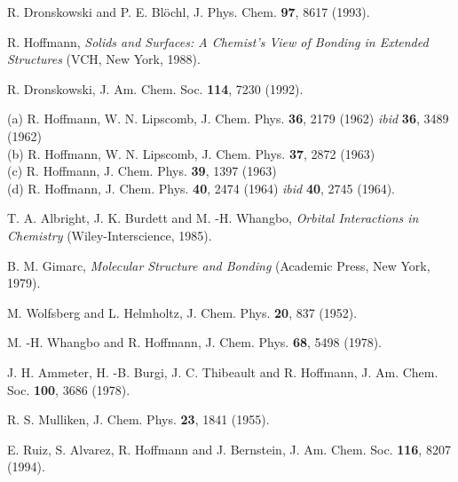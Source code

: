 
 R. Dronskowski and P. E. Bl\"{o}chl, J. Phys. Chem. {\bf 97}, 8617 (1993).

 R. Hoffmann, {\it Solids and Surfaces: A Chemist's View of Bonding in Extended Structures} (VCH, New York, 1988).

 R. Dronskowski, J. Am. Chem. Soc. {\bf 114}, 7230 (1992).


 (a) R. Hoffmann, W. N. Lipscomb, J. Chem. Phys. {\bf 36}, 2179 (1962) {\it ibid} {\bf 36}, 3489 (1962) \\ (b) R. Hoffmann, W. N. Lipscomb, J. Chem. Phys. {\bf 37}, 2872 (1963) \\ (c) R. Hoffmann, J. Chem. Phys. {\bf 39}, 1397 (1963) \\ (d) R. Hoffmann, J. Chem. Phys. {\bf 40}, 2474 (1964) {\it ibid} {\bf 40}, 2745 (1964).

 T. A. Albright, J. K. Burdett and M. -H. Whangbo, {\it Orbital Interactions in Chemistry} (Wiley-Interscience, 1985).

 B. M. Gimarc, {\it Molecular Structure and Bonding} (Academic Press, New York, 1979).

 M. Wolfsberg and L. Helmholtz, J. Chem. Phys. {\bf 20}, 837 (1952).

 M. -H. Whangbo and R. Hoffmann, J. Chem. Phys. {\bf 68}, 5498 (1978).

 J. H. Ammeter, H. -B. Burgi, J. C. Thibeault and R. Hoffmann, J. Am. Chem. Soc. {\bf 100}, 3686 (1978).

 R. S. Mulliken, J. Chem. Phys. {\bf 23}, 1841 (1955).


 E. Ruiz, S. Alvarez, R. Hoffmann and J. Bernstein, J. Am. Chem. Soc. {\bf 116}, 8207 (1994).



